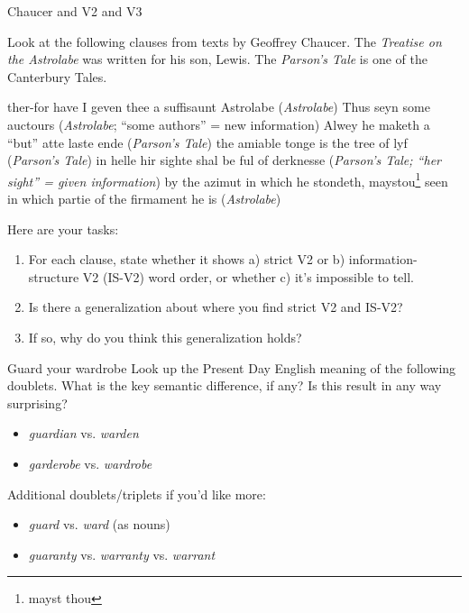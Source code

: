 \begin{exercises}{Chaucer and V2 and V3}\label{exercise-chaucer-V2}

Look at the following clauses from texts by Geoffrey Chaucer. The \emph{Treatise on the Astrolabe} was written for his son, Lewis. The \emph{Parson's Tale} is one of the Canterbury Tales.

\begin{exe}
    \ex\label{ex:chaucer-V2-a} ther-for have I geven thee a suffisaunt Astrolabe (\emph{Astrolabe})
    \ex\label{ex:chaucer-V2-b} Thus seyn some auctours (\emph{Astrolabe}; ``some authors'' = new information)
    \ex\label{ex:chaucer-V2-c} Alwey he maketh a ``but'' atte laste ende (\emph{Parson's Tale})
    \ex\label{ex:chaucer-V2-d} the amiable tonge is the tree of lyf (\emph{Parson's Tale})
    \ex\label{ex:chaucer-V2-e} in helle hir sighte shal be ful of derknesse (\emph{Parson's Tale; ``her sight'' = given information})
    \ex\label{ex:chaucer-V2-f} by the azimut in which he stondeth, maystou\footnote{mayst thou} seen in which partie of the firmament he is (\emph{Astrolabe})
\end{exe}

\noindent Here are your tasks:
\begin{enumerate}
    \item For each clause, state whether it shows a) strict V2 or b) information-structure V2 (IS-V2) word order, or whether c) it's impossible to tell.
    \item Is there a generalization about where you find strict V2 and IS-V2?
    \item If so, why do you think this generalization holds?
\end{enumerate}

\end{exercises}

\begin{exercises}{Guard your wardrobe}\label{exercise-wardrobe}
Look up the Present Day English meaning of the following doublets. What is the key semantic difference, if any? Is this result in any way surprising?
\begin{itemize}
    \item \textit{guardian} vs. \textit{warden}
    \item \textit{garderobe} vs. \textit{wardrobe}
\end{itemize}

\noindent Additional doublets/triplets if you'd like more:
\begin{itemize}
    \item \textit{guard} vs. \textit{ward} (as nouns)
    \item \textit{guaranty} vs. \textit{warranty} vs. \textit{warrant}
\end{itemize}


\end{exercises}

